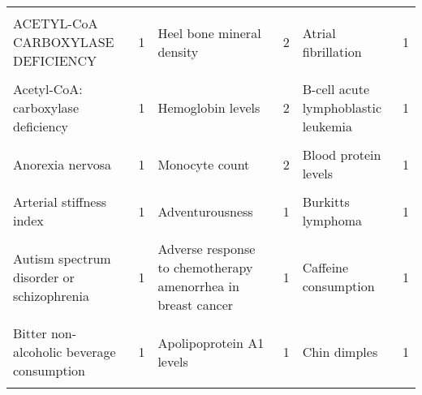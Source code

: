 \begin{table}[H]
{\begin{tabular}[t]{lrlrlr}
\cellcolor{gray!6}{Waist circumference} & \cellcolor{gray!6}{2} & \cellcolor{gray!6}{Heart Rate} & \cellcolor{gray!6}{2} & \cellcolor{gray!6}{Apolipoprotein B levels} & \cellcolor{gray!6}{1}\\
ACETYL-CoA CARBOXYLASE DEFICIENCY & 1 & Heel bone mineral density & 2 & Atrial fibrillation & 1\\
\cellcolor{gray!6}{ARTHROGRYPOSIS, CLEFT PALATE, CRANIOSYNOSTOSIS, AND IMPAIRED INTELLECTUAL DEVELOPMENT} & \cellcolor{gray!6}{1} & \cellcolor{gray!6}{Hemoglobin A, Glycosylated} & \cellcolor{gray!6}{2} & \cellcolor{gray!6}{Autosomal recessive primary microcephaly} & \cellcolor{gray!6}{1}\\
Acetyl-CoA: carboxylase deficiency & 1 & Hemoglobin levels & 2 & B-cell acute lymphoblastic leukemia & 1\\
\cellcolor{gray!6}{Albumin-globulin ratio} & \cellcolor{gray!6}{1} & \cellcolor{gray!6}{Mean arterial pressure} & \cellcolor{gray!6}{2} & \cellcolor{gray!6}{Basal cell carcinoma} & \cellcolor{gray!6}{1}\\
Anorexia nervosa & 1 & Monocyte count & 2 & Blood protein levels & 1\\
\cellcolor{gray!6}{Aorta} & \cellcolor{gray!6}{1} & \cellcolor{gray!6}{Venous thromboembolism adjusted for sickle cell variant rs77121243-T} & \cellcolor{gray!6}{2} & \cellcolor{gray!6}{Breast carcinoma} & \cellcolor{gray!6}{1}\\
Arterial stiffness index & 1 & Adventurousness & 1 & Burkitts lymphoma & 1\\
\cellcolor{gray!6}{Asthma (childhood onset)} & \cellcolor{gray!6}{1} & \cellcolor{gray!6}{Adverse response to chemotherapy (neutropenia/leucopenia) (carboplatin)} & \cellcolor{gray!6}{1} & \cellcolor{gray!6}{CELIAC DISEASE} & \cellcolor{gray!6}{1}\\
Autism spectrum disorder or schizophrenia & 1 & Adverse response to chemotherapy amenorrhea in breast cancer & 1 & Caffeine consumption & 1\\
\cellcolor{gray!6}{Autosomal dominant non-syndromic intellectual disability} & \cellcolor{gray!6}{1} & \cellcolor{gray!6}{Aorta} & \cellcolor{gray!6}{1} & \cellcolor{gray!6}{Carcinoma of esophagus} & \cellcolor{gray!6}{1}\\
Bitter non-alcoholic beverage consumption & 1 & Apolipoprotein A1 levels & 1 & Chin dimples & 1\\
\cellcolor{gray!6}{Blood Cells} & \cellcolor{gray!6}{1} & \cellcolor{gray!6}{Blood Cells} & \cellcolor{gray!6}{1} & \cellcolor{gray!6}{Chronic lymphocytic leukemia} & \cellcolor{gray!6}{1}\\

\end{tabular}}
\end{table}
